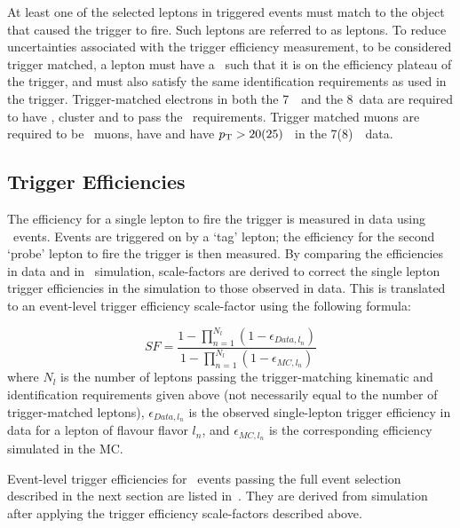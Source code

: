 At least one of the selected leptons in triggered events must match to the
object that caused the trigger to fire. Such leptons are referred to as 
 leptons. To reduce uncertainties associated with the
trigger efficiency measurement, to be considered trigger matched,
a lepton must have a \pt\ such that it is on the efficiency plateau of the
trigger, and must also satisfy the same identification requirements as
used in the trigger. Trigger-matched electrons in both the 7~\tev\ and the
8~\tev data
are required to have , cluster  and to pass the \mediumPP\
requirements. Trigger matched muons are required to be \combined\ muons, have
\modetalt{2.4} and have $p_{\mathrm{T}} > 20 (25)$ \gev\ in the 7(8)~\tev\ data.

\subsection{Trigger Efficiencies}

The efficiency for a single lepton to fire the trigger is measured in data using
\Zll\ events. Events are triggered on by a `tag' lepton; the efficiency for
the second `probe' lepton to fire the trigger is then measured. By comparing the
efficiencies in data and in \mc\ simulation, scale-factors are derived to
correct the single lepton trigger efficiencies in the simulation to those
observed in data.  This is translated to an event-level trigger efficiency
scale-factor using the following formula:

\begin{equation}
\label{eqn:triggerEffSF}
  SF =  { \frac{ {1 - \prod_{n=1}^{N_l} (1 - \epsilon_{Data,l_n})}} {1 - \prod_{n=1}^{N_l} (1 - \epsilon_{MC,l_n})} }
\end{equation}
where $N_l$ is the number of leptons passing the trigger-matching kinematic and
identification requirements
given above (not necessarily equal to the number of trigger-matched leptons),
$\epsilon_{Data,l_n}$ is the observed single-lepton trigger efficiency in data
for a lepton of flavour flavor $l_n$, and $\epsilon_{MC,l_n}$ is
the corresponding efficiency simulated in the MC. 

Event-level trigger efficiencies for \ZZ\ events passing the full event
selection described in the next section are listed in~\tab{triggerMCeff}. They
are derived from simulation after applying the trigger efficiency scale-factors
described above.

